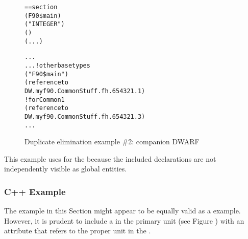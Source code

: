 \begin{figure}
\begin{dwflisting}
\begin{alltt}
== section \dotdebuginfo{}
        (F90\$main)
            ("INTEGER")
            ()
            (...)

            ...
        ...  ! other base types
            ("F90\$main")
                (reference to
                    DW.myf90.CommonStuff.fh.654321.1)
             ! for Common1
                (reference to
                    DW.myf90.CommonStuff.fh.654321.3)
            ...
\end{alltt}
\end{dwflisting}
\caption{Duplicate elimination example \#2: companion DWARF }
\label{fig:duplicateeliminationexample2companiondwarf}
\end{figure}

This example uses  for the 
because the included declarations are not independently
visible as global entities.


\subsubsection{C++ Example}

The  example 
in this Section might appear to be equally
valid as a  example. However, it is prudent to include
a 
in the primary unit 
(see Figure )
with an  attribute that refers to the proper unit
in the .

